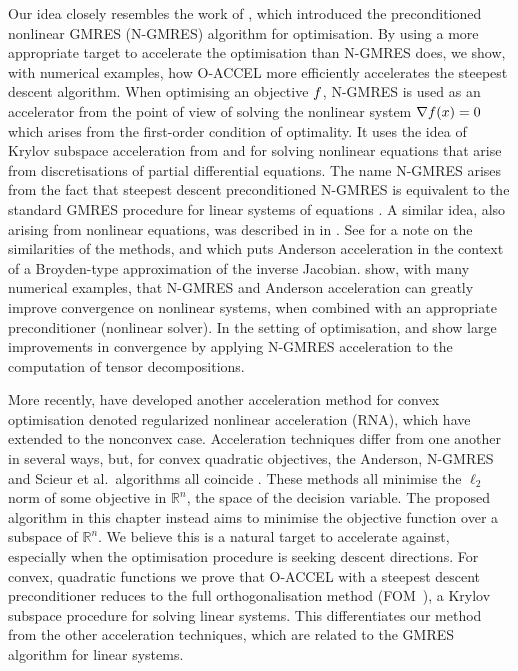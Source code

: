 \documentclass[main.tex]{subfiles}
\begin{document}
Our idea closely resembles the work of \citet{sterck2013steepest},
which introduced the preconditioned nonlinear GMRES (N-GMRES)
algorithm for optimisation. By using a more appropriate target to
accelerate the optimisation than N-GMRES does, we show, with numerical
examples, how O-ACCEL more efficiently accelerates the steepest
descent algorithm.  When optimising an objective $f$, N-GMRES is
used as an accelerator from the point of view of solving the nonlinear
system $\nabla f(x)=0$ which arises from the first-order condition
of optimality.  It uses the idea of Krylov subspace acceleration from
\citet{washio1997krylov} and \citet{oosterlee2000krylov} for solving
nonlinear equations that arise from discretisations of partial
differential equations.  The name N-GMRES arises from the fact that
steepest descent preconditioned N-GMRES is equivalent to the standard
GMRES procedure for linear systems of equations
\citep{washio1997krylov,sterck2013steepest}.  A similar idea, also
arising from nonlinear equations, was described in
\citet{anderson1965iterative} in \citeyear{anderson1965iterative}. See
\citet{walker2011anderson} for a note on the similarities of the
methods, and \citet{fang2009two} which puts Anderson acceleration in
the context of a Broyden-type approximation of the inverse Jacobian.
\citet{brune2015composing} show, with many numerical examples, that
N-GMRES and Anderson acceleration can greatly improve convergence on
nonlinear systems, when combined with an appropriate preconditioner
(nonlinear solver).  In the setting of optimisation,
\citet{sterck2012nonlinear} and \citet{sterck2016nonlinearly} show
large improvements in convergence by applying N-GMRES acceleration to
the computation of tensor decompositions.

More recently, \citet{damien2016regularized} have developed another
acceleration method for convex optimisation denoted regularized
nonlinear acceleration (RNA), which \citet{cartis2017accelerating}
have extended to the nonconvex case.  Acceleration techniques differ
from one another in several ways, but, for convex quadratic
objectives, the Anderson, N-GMRES and Scieur et al.\ algorithms all
coincide \citep{cartis2017accelerating}.  These methods all minimise
the $\ell_2$ norm of some objective in $\mathbb{R}^n$, the space of
the decision variable.  The proposed algorithm in this chapter
instead aims to minimise the objective function over a subspace of
$\mathbb{R}^n$.  We believe this is a natural target to accelerate
against, especially when the optimisation procedure is seeking descent
directions.  For convex, quadratic functions we prove that O-ACCEL
with a steepest descent preconditioner reduces to the full
orthogonalisation method (FOM~\cite{saad2003iterative}), a Krylov
subspace procedure for solving linear systems. This differentiates our
method from the other acceleration techniques, which are related to
the GMRES algorithm for linear systems.
\end{document}
